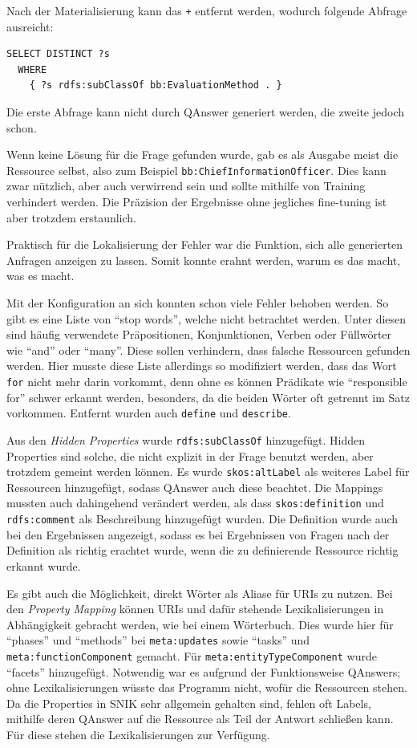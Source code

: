 \documentclass[utf8,biblatex]{lni}
\begin{document}
Nach der Materialisierung kann das \texttt{+} entfernt werden, wodurch folgende Abfrage ausreicht:
\begin{lstlisting}[language=SPARQL]
  SELECT DISTINCT ?s
  WHERE
    { ?s rdfs:subClassOf bb:EvaluationMethod . }
\end{lstlisting}

Die erste Abfrage kann nicht durch QAnswer generiert werden, die zweite jedoch schon.

Wenn keine Lösung für die Frage gefunden wurde, gab es als Ausgabe meist die Ressource selbst, also zum Beispiel \texttt{bb:ChiefInformationOfficer}.
Dies kann zwar nützlich, aber auch verwirrend sein und sollte mithilfe von Training verhindert werden.
Die Präzision der Ergebnisse ohne jegliches fine-tuning ist aber trotzdem erstaunlich.

Praktisch für die Lokalisierung der Fehler war die Funktion, sich alle generierten Anfragen anzeigen zu lassen.
Somit konnte erahnt werden, warum es das macht, was es macht.

Mit der Konfiguration an sich konnten schon viele Fehler behoben werden.
So gibt es eine Liste von \enquote{stop words}, welche nicht betrachtet werden.
Unter diesen sind häufig verwendete Präpositionen, Konjunktionen, Verben oder Füllwörter wie \enquote{and} oder \enquote{many}.
Diese sollen verhindern, dass falsche Ressourcen gefunden werden.
Hier musste diese Liste allerdings so modifiziert werden, dass das Wort \texttt{for} nicht mehr darin vorkommt, denn ohne es können Prädikate wie \enquote{responsible for} schwer erkannt werden,
besonders, da die beiden Wörter oft getrennt im Satz vorkommen.
Entfernt wurden auch \texttt{define} und \texttt{describe}.

Aus den \emph{Hidden Properties} wurde \texttt{rdfs:subClassOf} hinzugefügt.
Hidden Properties sind solche, die nicht explizit in der Frage benutzt werden, aber trotzdem gemeint werden können.
Es wurde \texttt{skos:altLabel} als weiteres Label für Ressourcen hinzugefügt, sodass QAnswer auch diese beachtet.
Die Mappings mussten auch dahingehend verändert werden, als dass \texttt{skos:definition}
und \texttt{rdfs:comment} als Beschreibung hinzugefügt wurden.
Die Definition wurde auch bei den Ergebnissen angezeigt, sodass es bei Ergebnissen von Fragen nach der Definition als richtig erachtet wurde, wenn die zu definierende Ressource richtig erkannt wurde.

Es gibt auch die Möglichkeit, direkt Wörter als Aliase für URIs zu nutzen.
Bei den \emph{Property Mapping} können URIs und dafür stehende Lexikalisierungen in Abhängigkeit gebracht werden, wie bei einem Wörterbuch.
Dies wurde hier für \enquote{phases} und \enquote{methods} bei \texttt{meta:updates} sowie \enquote{tasks} und \texttt{meta:functionComponent} gemacht.
Für \texttt{meta:entityTypeComponent} wurde \enquote{facets} hinzugefügt.
Notwendig war es aufgrund der Funktionsweise QAnswers; ohne Lexikalisierungen wüsste das Programm nicht, wofür die Ressourcen stehen.
Da die Properties in SNIK sehr allgemein gehalten sind, fehlen oft Labels, mithilfe deren QAnswer auf die Ressource als Teil der Antwort schließen kann.
Für diese stehen die Lexikalisierungen zur Verfügung.
\end{document}
